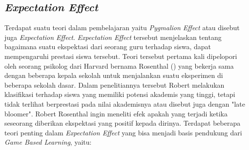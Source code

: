 	
	\subsection{\textit{Expectation Effect}}
	Terdapat suatu teori dalam pembelajaran yaitu \textit{Pygmalion Effect} atau disebut juga \textit{Expectation Effect}. \textit{Expectation Effect} tersebut menjelaskan tentang bagaimana suatu ekspektasi dari seorang guru terhadap siswa, dapat mempengaruhi prestasi siswa tersebut. Teori tersebut pertama kali dipelopori oleh seorang psikolog dari Harvard bernama Rosenthal (\citeyear{paper.rosenthal}) yang bekerja sama dengan beberapa kepala sekolah untuk menjalankan suatu eksperimen di beberapa sekolah dasar. Dalam penelitiannya tersebut Robert melakukan klasifikasi terhadap siswa yang memiliki potensi akademis yang tinggi, tetapi tidak terlihat berprestasi pada nilai akademisnya atau disebut juga dengan "late bloomer". Robert Rosenthal ingin meneliti efek apakah yang terjadi ketika seseorang diberikan ekspektasi yang positif kepada dirinya.
	\linebreak \linebreak
	Terdapat beberapa teori penting dalam \textit{Expectation Effect} yang bisa menjadi basis pendukung dari \textit{Game Based Learning}, yaitu:
